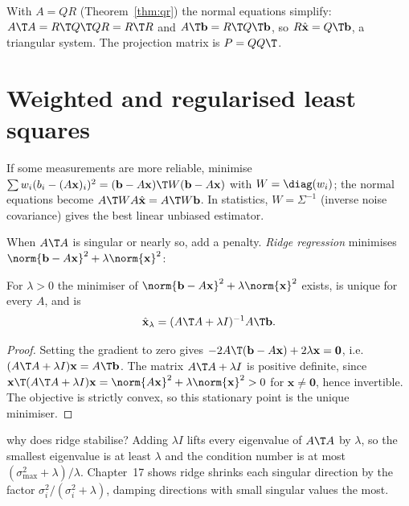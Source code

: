 With $A=QR$ (Theorem~\ref{thm:qr}) the normal equations simplify: $A\T A=R\T Q\T QR=R\T R$ and $A\T\mathbf{b}=R\T Q\T\mathbf{b}$, so $R\hat{\mathbf{x}}=Q\T\mathbf{b}$, a triangular system. The projection matrix is $P=QQ\T$.

\section{Weighted and regularised least squares}

If some measurements are more reliable, minimise $\sum w_i(b_i-(A\mathbf{x})_i)^2=(\mathbf{b}-A\mathbf{x})\T W(\mathbf{b}-A\mathbf{x})$ with $W=\diag(w_i)$; the normal equations become $A\T WA\hat{\mathbf{x}}=A\T W\mathbf{b}$. In statistics, $W=\Sigma^{-1}$ (inverse noise covariance) gives the best linear unbiased estimator.

When $A\T A$ is singular or nearly so, add a penalty. \emph{Ridge regression} minimises $\norm{\mathbf{b}-A\mathbf{x}}^2+\lambda\norm{\mathbf{x}}^2$:

\begin{theorem}\label{thm:ridge}
For $\lambda>0$ the minimiser of $\norm{\mathbf{b}-A\mathbf{x}}^2+\lambda\norm{\mathbf{x}}^2$ exists, is unique for every $A$, and is
\[ \hat{\mathbf{x}}_\lambda=(A\T A+\lambda I)^{-1}A\T\mathbf{b}. \]
\end{theorem}

\begin{proof}
Setting the gradient to zero gives $-2A\T(\mathbf{b}-A\mathbf{x})+2\lambda\mathbf{x}=\mathbf{0}$, i.e.\ $(A\T A+\lambda I)\mathbf{x}=A\T\mathbf{b}$. The matrix $A\T A+\lambda I$ is positive definite, since $\mathbf{x}\T(A\T A+\lambda I)\mathbf{x}=\norm{A\mathbf{x}}^2+\lambda\norm{\mathbf{x}}^2>0$ for $\mathbf{x}\ne\mathbf{0}$, hence invertible. The objective is strictly convex, so this stationary point is the unique minimiser.
\end{proof}

\begin{interview}{why does ridge stabilise?}
Adding $\lambda I$ lifts every eigenvalue of $A\T A$ by $\lambda$, so the smallest eigenvalue is at least $\lambda$ and the condition number is at most $(\sigma_{\max}^2+\lambda)/\lambda$. Chapter~17 shows ridge shrinks each singular direction by the factor $\sigma_i^2/(\sigma_i^2+\lambda)$, damping directions with small singular values the most.
\end{interview}

